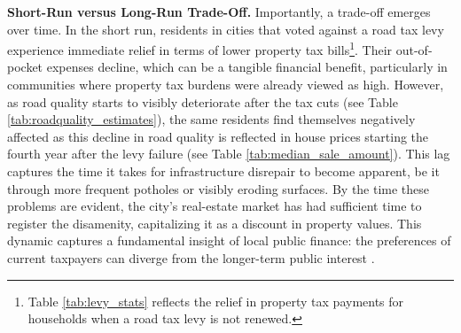
{\bf Short-Run versus Long-Run Trade-Off.} Importantly, a trade-off emerges over time. In the short run, residents in cities that voted against a road tax levy experience immediate relief in terms of lower property tax bills\footnote{Table \ref{tab:levy_stats} reflects the relief in property tax payments for households when a road tax levy is not renewed.}. Their out-of-pocket expenses decline, which can be a tangible financial benefit, particularly in communities where property tax burdens were already viewed as high. However, as road quality starts to visibly deteriorate after the tax cuts (see Table \ref{tab:roadquality_estimates}), the same residents find themselves negatively affected as this decline in road quality is reflected in house prices starting the fourth year after the levy failure (see Table \ref{tab:median_sale_amount}). This lag captures the time it takes for infrastructure disrepair to become apparent, be it through more frequent potholes or visibly eroding surfaces. By the time these problems are evident, the city’s real-estate market has had sufficient time to register the disamenity, capitalizing it as a discount in property values. This dynamic captures a fundamental insight of local public finance: the preferences of current taxpayers can diverge from the longer-term public interest \citep{BuchananTullock1962, AlesinaTabellini1990}. 




